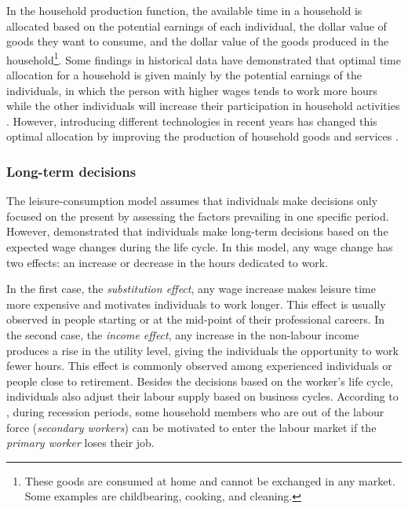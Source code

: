 In the household production function, the available time in a household is allocated based on the potential earnings of each individual, the dollar value of goods they want to consume, and the dollar value of the goods produced in the household\footnote{These goods are consumed at home and cannot be exchanged in any market. Some examples are childbearing, cooking, and cleaning.}. Some findings in historical data have demonstrated that optimal time allocation for a household is given mainly by the potential earnings of the individuals, in which the person with higher wages tends to work more hours while the other individuals will increase their participation in household activities \citep{Borjas2020}. However, introducing different technologies in recent years has changed this optimal allocation by improving the production of household goods and services \citep{Benjamin2021}. 

\subsubsection{Long-term decisions} 

The leisure-consumption model assumes that individuals make decisions only focused on the present by assessing the factors prevailing in one specific period. However, \citet{McCurdy1980} demonstrated that individuals make long-term decisions based on the expected wage changes during the life cycle. In this model, any wage change has two effects: an increase or decrease in the hours dedicated to work.

In the first case, the \textit{substitution effect}, any wage increase makes leisure time more expensive and motivates individuals to work longer. This effect is usually observed in people starting or at the mid-point of their professional careers. In the second case, the \textit{income effect}, any increase in the non-labour income produces a rise in the utility level, giving the individuals the opportunity to work fewer hours. This effect is commonly observed among experienced individuals or people close to retirement. Besides the decisions based on the worker's life cycle, individuals also adjust their labour supply based on business cycles. According to \citet{Borjas2020}, during recession periods, some household members who are out of the labour force (\textit{secondary workers}) can be motivated to enter the labour market if the \textit{primary worker} loses their job. 

